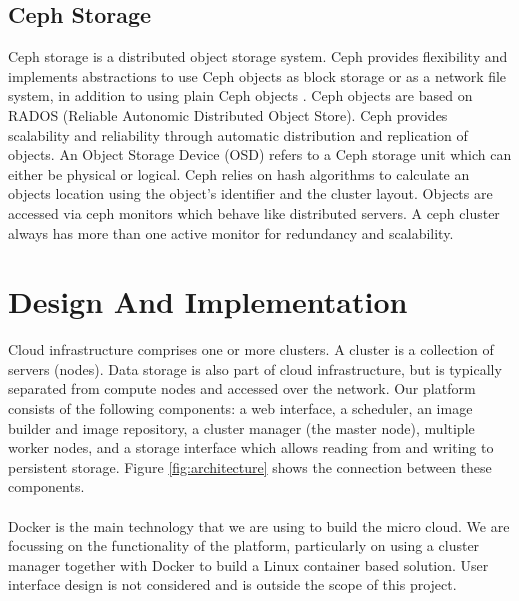 \documentclass{sig-alternate-05-2015}
\begin{document}
\subsection{Ceph Storage}
Ceph storage is a distributed object storage system. Ceph provides flexibility and implements abstractions to use Ceph objects as block storage or as a network file system, in addition to using plain Ceph objects \cite{wang2013performance}. Ceph objects are based on RADOS (Reliable Autonomic Distributed Object Store). Ceph provides scalability and reliability through automatic distribution and replication of objects. An Object Storage Device (OSD) refers to a Ceph storage unit which can either be physical or logical. Ceph relies on hash algorithms to calculate an objects location using the object's identifier and the cluster layout. Objects are accessed via ceph monitors which behave like distributed servers. A ceph cluster always has more than one active monitor for redundancy and scalability.


\section{Design And Implementation}


Cloud infrastructure comprises one or more clusters. A cluster is a collection of servers (nodes). Data storage is also part of cloud infrastructure, but is typically separated from compute nodes and accessed over the network. Our platform consists of the following components: a web interface, a scheduler, an image builder and image repository, a cluster manager (the master node), multiple worker nodes, and a storage interface which allows reading from and writing to persistent storage. Figure \ref{fig:architecture} shows the connection between these components.
\\\\
Docker is the main technology that we are using to build the micro cloud. We are focussing on the functionality of the platform, particularly on using a cluster manager together with Docker to build a Linux container based solution. User interface design is not considered and is outside the scope of this project. 
\end{document}

